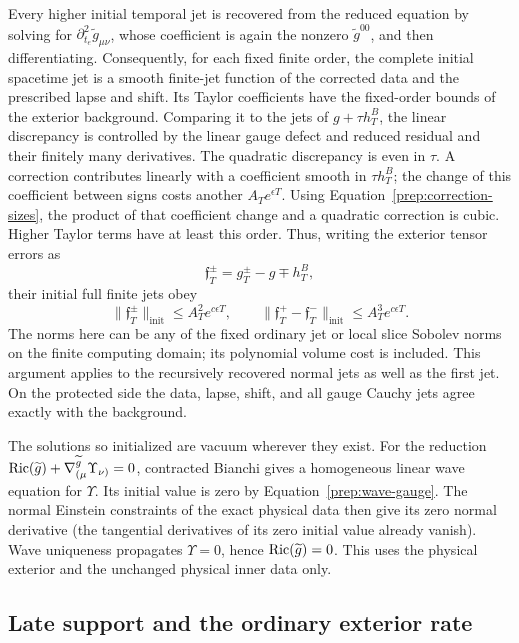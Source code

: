 Every higher initial temporal jet is recovered from the reduced
equation by solving for $\partial_{t_e}^2\widetilde g_{\mu\nu}$,
whose coefficient is again the nonzero $\widetilde g^{00}$, and
then differentiating.  Consequently, for each fixed finite order,
the complete initial spacetime jet is a smooth finite-jet function
of the corrected data and the prescribed lapse and shift.  Its
Taylor coefficients have the fixed-order bounds of the exterior
background.  Comparing it to the jets of $g+\tau h_T^B$, the linear
discrepancy is controlled by the linear gauge defect and reduced
residual and their finitely many derivatives.  The quadratic
discrepancy is even in $\tau$.  A correction contributes linearly
with a coefficient smooth in $\tau h_T^B$; the change of this
coefficient between signs costs another $A_Te^{\epsilon T}$.
Using Equation~\eqref{prep:correction-sizes}, the product of that
coefficient change and a quadratic correction is cubic.  Higher
Taylor terms have at least this order.  Thus, writing the exterior
tensor errors as
\[
 \mathfrak f_T^\pm=g_T^\pm-g\mp h_T^B,
\]
their initial full finite jets obey
\begin{equation}\label{prep:initial-gauge-errors}
 \|\mathfrak f_T^\pm\|_{\mathrm{init}}
      \le A_T^2e^{c\epsilon T},\qquad
 \|\mathfrak f_T^+-\mathfrak f_T^-\|_{\mathrm{init}}
      \le A_T^3e^{c\epsilon T}.
\end{equation}
The norms here can be any of the fixed ordinary jet or local slice
Sobolev norms on the finite computing domain; its polynomial volume
cost is included.  This argument applies to the recursively
recovered normal jets as well as the first jet.  On the protected
side the data, lapse, shift, and all gauge Cauchy jets agree exactly
with the background.

The solutions so initialized are vacuum wherever they exist.  For
the reduction
$\operatorname{Ric}(\widetilde g)+\nabla^{\widetilde g}_{(\mu}\Upsilon_{\nu)}=0$,
contracted Bianchi gives a homogeneous linear wave equation for
$\Upsilon$.  Its initial value is zero by
Equation~\eqref{prep:wave-gauge}.  The normal Einstein constraints
of the exact physical data then give its zero normal derivative
(the tangential derivatives of its zero initial value already
vanish).  Wave uniqueness propagates $\Upsilon=0$, hence
$\operatorname{Ric}(\widetilde g)=0$.  This uses the physical exterior and the
unchanged physical inner data only.

\subsection{Late support and the ordinary exterior rate}\label{prep:exterior-rate-section}

